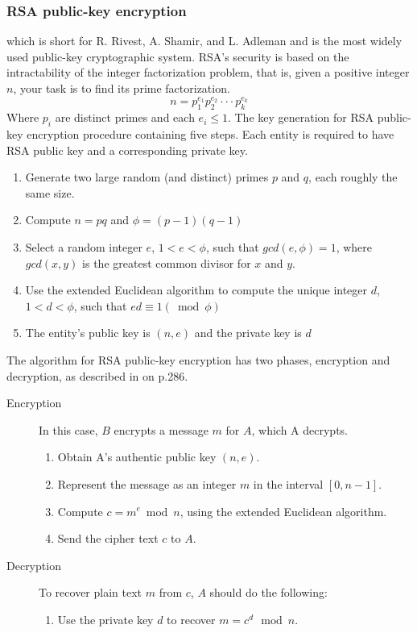 \documentclass{acm_proc_article-sp}
\begin{document}
    \subsubsection{RSA public-key encryption}
    which is short for R. Rivest, A. Shamir, and L. Adleman and is the most widely used public-key cryptographic system. \cite{handcrypt} RSA's security is based on the intractability of the integer factorization problem, that is, given a positive integer $n$, your task is to find its prime factorization. 
    \begin{equation*} %
        n=p_{1}^{e_1}p_{2}^{e_2} \cdot \cdot \cdot p_{k}^{e_k}
    \end{equation*}
    Where $p_i$ are distinct primes and each $e_i \leq 1$. \cite{handcrypt} The key generation for RSA public-key encryption procedure containing five steps. Each entity is required to have RSA public key and a corresponding private key. 
    \begin{enumerate} %
        \item Generate two large random (and distinct) primes $p$ and $q$, each roughly the same size. 
        \item Compute $n=pq$ and $\phi = (p-1)(q-1)$
        \item Select a random integer $e$, $1 < e < \phi$, such that $gcd(e,\phi)=1$, where $gcd(x,y)$ is the greatest common divisor for $x$ and $y$. 
        \item Use the extended Euclidean algorithm to compute the unique integer $d$, $1<d<\phi$, such that $ed \equiv 1 (\bmod \phi)$
        \item The entity's public key is $(n,e)$ and the private key is $d$\hfill \cite{handcrypt}
    \end{enumerate}
    The algorithm for RSA public-key encryption has two phases, encryption and decryption, as described in \cite{handcrypt} on p.286.
    \begin{description}
            \item[Encryption] In this case, $B$ encrypts a message $m$ for $A$, which A decrypts.
            \begin{enumerate}
                \item Obtain A's authentic public key $(n,e)$.
                \item Represent the message as an integer $m$ in the interval $[0,n-1]$.
                \item Compute $c=m^e \bmod n$, using the extended Euclidean algorithm.
                \item Send the cipher text $c$ to $A$. 
            \end{enumerate}
            
            \item[Decryption] To recover plain text $m$ from $c$, $A$ should do the following: 
            \begin{enumerate}
                \item Use the private key $d$ to recover $m=c^d \, \bmod n$. 
            \end{enumerate}
    \end{description}
    
\end{document}
